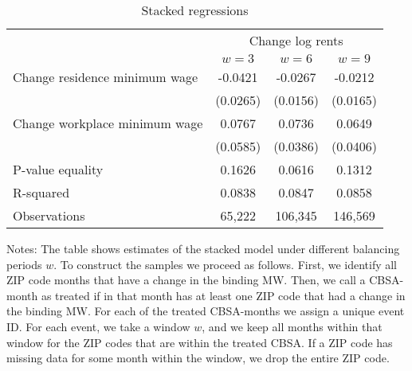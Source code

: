 \begin{table}[]
    \caption{Stacked regressions}
    \label{tab:stacked}
    \centering

    \begin{tabular}{@{}lccc@{}}
        \toprule
                                      & \multicolumn{3}{c}{Change log rents} \\ \cmidrule(l){2-4} 
                                      & $w=3$      & $w=6$     & $w=9 $      \\ \midrule
        Change residence minimum wage & -0.0421        & -0.0267       &  -0.0212        \\
                                      & (0.0265)      & (0.0156)     & (0.0165)       \\
        Change workplace minimum wage & 0.0767        & 0.0736       & 0.0649         \\
                                      & (0.0585)      & (0.0386)     & (0.0406)       \\ \midrule
        P-value equality              & 0.1626        & 0.0616       & 0.1312         \\
        R-squared                     & 0.0838        & 0.0847       & 0.0858         \\
        Observations                  & 65,222       & 106,345      & 146,569        \\ \bottomrule
    \end{tabular}
    
    \begin{minipage}{.95\textwidth} \footnotesize
        \vspace{2mm}
        Notes: The table shows estimates of the stacked model under different balancing
        periods $w$.
        To construct the samples we proceed as follows. First, we identify all ZIP code months
        that have a change in the binding MW. Then, we call a CBSA-month as treated if in 
        that month has at least one ZIP code that had a change in the binding MW. For each 
        of the treated CBSA-months we assign a unique event ID. For each event, we take a 
        window $w$, and we keep all months within that window for the ZIP codes that are within
        the treated CBSA. If a ZIP code has missing data for some month within the window, 
        we drop the entire ZIP code. 
    \end{minipage}
\end{table}
